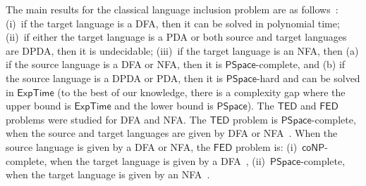 \documentclass{CSML}
\newcommand{\PSPACE}{\textsf{PSpace}}
\newcommand{\EXPTIME}{\textsf{ExpTime}}
\newcommand{\coNP}{\textsf{coNP}}
\newcommand{\TED}{\mathsf{TED}}
\newcommand{\FED}{\mathsf{FED}}
\begin{document}
\smallskip{}
The main results for the classical language inclusion problem are as follows~\cite{HU79}: 
(i)~if the target language is a DFA, then it can be solved in polynomial time;
(ii)~if either the target language is a PDA or both source and target languages are DPDA, 
then it is undecidable; 
(iii)~if the target language is an NFA, then (a) if the source language
is a DFA or NFA, then it is $\PSPACE$-complete, and (b) if the source language 
is a DPDA or PDA, then it is $\PSPACE$-hard and can be solved in $\EXPTIME$ 
(to the best of our knowledge, there is a complexity gap where the upper 
bound is $\EXPTIME$ and the lower bound is $\PSPACE$). 
The $\TED$ and $\FED$ problems were studied for DFA and NFA. 
The $\TED$ problem is $\PSPACE$-complete, when the source and target languages are 
given by DFA or NFA~\cite{riveros,boundedRiveros}. 
When the source language is given by a DFA or NFA, the $\FED$ problem is: 
(i)~$\coNP$-complete, when the target language is given by a DFA~\cite{boundedRiveros},
(ii)~$\PSPACE$-complete, when the target language is given by an NFA~\cite{boundedRiveros}.
\end{document}
